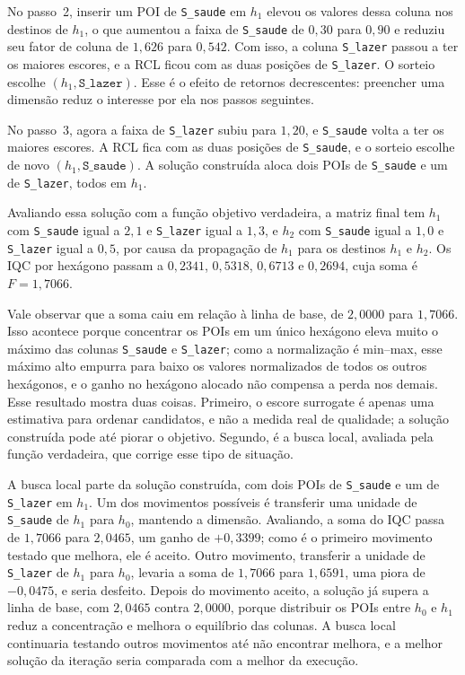\documentclass[11pt,a4paper]{article}
\newcommand{\code}[1]{\texttt{#1}}
\begin{document}
No passo~2, inserir um POI de \code{S\_saude} em $h_1$ elevou os valores dessa coluna nos destinos de $h_1$, o que aumentou a faixa de \code{S\_saude} de $0{,}30$ para $0{,}90$ e reduziu seu fator de coluna de $1{,}626$ para $0{,}542$. Com isso, a coluna \code{S\_lazer} passou a ter os maiores escores, e a RCL ficou com as duas posições de \code{S\_lazer}. O sorteio escolhe $(h_1, \code{S\_lazer})$. Esse é o efeito de retornos decrescentes: preencher uma dimensão reduz o interesse por ela nos passos seguintes.

No passo~3, agora a faixa de \code{S\_lazer} subiu para $1{,}20$, e \code{S\_saude} volta a ter os maiores escores. A RCL fica com as duas posições de \code{S\_saude}, e o sorteio escolhe de novo $(h_1, \code{S\_saude})$. A solução construída aloca dois POIs de \code{S\_saude} e um de \code{S\_lazer}, todos em $h_1$.

Avaliando essa solução com a função objetivo verdadeira, a matriz final tem $h_1$ com \code{S\_saude} igual a $2{,}1$ e \code{S\_lazer} igual a $1{,}3$, e $h_2$ com \code{S\_saude} igual a $1{,}0$ e \code{S\_lazer} igual a $0{,}5$, por causa da propagação de $h_1$ para os destinos $h_1$ e $h_2$. Os IQC por hexágono passam a $0{,}2341$, $0{,}5318$, $0{,}6713$ e $0{,}2694$, cuja soma é $F = 1{,}7066$.

Vale observar que a soma caiu em relação à linha de base, de $2{,}0000$ para $1{,}7066$. Isso acontece porque concentrar os POIs em um único hexágono eleva muito o máximo das colunas \code{S\_saude} e \code{S\_lazer}; como a normalização é min--max, esse máximo alto empurra para baixo os valores normalizados de todos os outros hexágonos, e o ganho no hexágono alocado não compensa a perda nos demais. Esse resultado mostra duas coisas. Primeiro, o escore surrogate é apenas uma estimativa para ordenar candidatos, e não a medida real de qualidade; a solução construída pode até piorar o objetivo. Segundo, é a busca local, avaliada pela função verdadeira, que corrige esse tipo de situação.

A busca local parte da solução construída, com dois POIs de \code{S\_saude} e um de \code{S\_lazer} em $h_1$. Um dos movimentos possíveis é transferir uma unidade de \code{S\_saude} de $h_1$ para $h_0$, mantendo a dimensão. Avaliando, a soma do IQC passa de $1{,}7066$ para $2{,}0465$, um ganho de $+0{,}3399$; como é o primeiro movimento testado que melhora, ele é aceito. Outro movimento, transferir a unidade de \code{S\_lazer} de $h_1$ para $h_0$, levaria a soma de $1{,}7066$ para $1{,}6591$, uma piora de $-0{,}0475$, e seria desfeito. Depois do movimento aceito, a solução já supera a linha de base, com $2{,}0465$ contra $2{,}0000$, porque distribuir os POIs entre $h_0$ e $h_1$ reduz a concentração e melhora o equilíbrio das colunas. A busca local continuaria testando outros movimentos até não encontrar melhora, e a melhor solução da iteração seria comparada com a melhor da execução.
\end{document}
